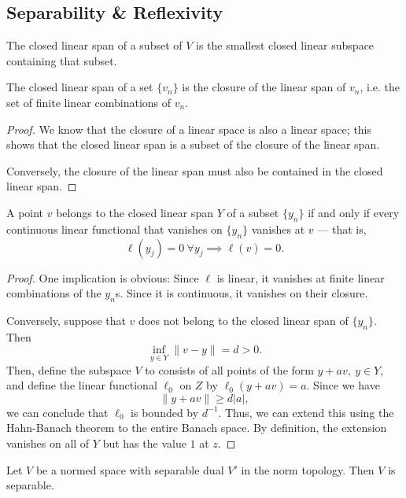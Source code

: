 \documentclass[twoside,symmetric, openany, 12pt]{./tuftebook}
\theoremstyle{definition}
\theoremstyle{definition}
\theoremstyle{definition}
\begin{document}
\subsection{Separability \& Reflexivity}
\begin{Definition}
	The closed linear span of a subset of $V$ is the smallest closed linear subspace containing that subset.
\end{Definition}
\begin{Lemma}
	The closed linear span of a set $\{v_n\} $ is the closure of the linear span of $v_n$, i.e. the set of finite linear combinations of $v_n$.
\end{Lemma}
\begin{proof}
	We know that the closure of a linear space is also a linear space; this shows that the closed linear span is a subset of the closure of the linear span.
	
	Conversely, the closure of the linear span must also be contained in the closed linear span.
\end{proof}
\begin{Theorem}\label{thm:spanningcriterion}
	A point $v$ belongs to the closed linear span $Y$ of a subset $\{y_n\} $ if and only if every continuous linear functional that vanishes on $\{y_n\} $ vanishes at $v$ --- that is,
	\[
	\ell(y_j)=0~\forall y_j\implies \ell(v)=0
	.\] 
\end{Theorem}
\begin{proof}
	One implication is obvious: Since $\ell$ is linear, it vanishes at finite linear combinations of the $y_n$s. Since it is continuous, it vanishes on their closure.  
	
	Conversely, suppose that $v$ does not belong to the closed linear span of $\{y_n\}$. Then 
	\[\inf_{y\in Y}\|v - y\| = d > 0.\]
	Then, define the subspace $V$ to consists of all points of the form $y+av,~y\in Y$, and define the linear functional $\ell_0$ on $Z$ by $\ell_0(y + av) = a$. Since we have
	\[\|y + av\| \ge d |a|,\]
	we can conclude that $\ell_0$ is bounded by $d^{-1}$. Thus, we can extend this using the Hahn-Banach theorem to the entire Banach space. By definition, the extension vanishes on all of $Y$ but has the value $1$ at $z$.
\end{proof}
\begin{Theorem}
	Let $V$ be a normed space with separable dual $V'$ in the norm topology. Then $V$ is separable. 
\end{Theorem}
\end{document}

